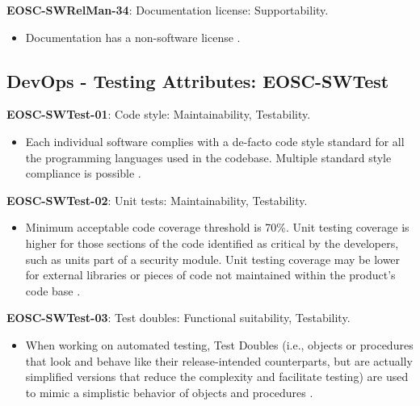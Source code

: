 \textbf{EOSC-SWRelMan-34}: Documentation license: Supportability.

\begin{itemize}
    \item Documentation has a non-software license \cite{orviz_fernandez_eosc-synergy_2020}.
\end{itemize}

\subsection{DevOps - Testing Attributes: EOSC-SWTest}

\textbf{EOSC-SWTest-01}: Code style: Maintainability, Testability.

\begin{itemize}
    \item Each individual software complies with a de-facto code style standard for all the programming languages used in the codebase. Multiple standard style compliance is possible \cite{orviz_set_2017,raymond_software_2013}.
\end{itemize}

\textbf{EOSC-SWTest-02}: Unit tests: Maintainability, Testability.

\begin{itemize}
    \item Minimum acceptable code coverage threshold is 70\%. Unit testing coverage is higher for those sections of the code identified as critical by the developers, such as units part of a security module. Unit testing coverage may be lower for external libraries or pieces of code not maintained within the product's code base \cite{aberdour_achieving_2007,nagappan_early_2005,boehm_quantitative_1976,shepherdson_cessda_2019,orviz_set_2017,raymond_software_2013}.
\end{itemize}

\textbf{EOSC-SWTest-03}: Test doubles: Functional suitability, Testability.

\begin{itemize}
    \item When working on automated testing,  Test Doubles (i.e., objects or procedures that look and behave like their release-intended counterparts, but are actually simplified versions that reduce the complexity and facilitate testing) are used to mimic a simplistic behavior of objects and procedures \cite{orviz_set_2017,orviz_fernandez_eosc-synergy_2020}.
\end{itemize}

